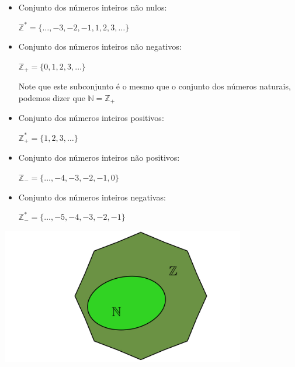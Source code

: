 \documentclass[10pt]{article}
\begin{document}
\begin{multicols}{2}
    \begin{itemize}
        \item Conjunto dos números inteiros não nulos:

            \( \mathbb{Z}^* = \{\ldots, -3, -2, -1, 1, 2, 3, \ldots \} \)
        \item Conjunto dos números inteiros não negativos:
            
            \( \mathbb{Z}_+ = \{0, 1, 2, 3, \ldots \} \)
            
            \begin{obs}
            Note que este subconjunto é o mesmo que o conjunto dos números naturais, podemos dizer que \( \mathbb{N} = \mathbb{Z}_+\)
            \end{obs}
        \item Conjunto dos números inteiros positivos:
        
            \( \mathbb{Z}^*_+ = \{1, 2, 3, \ldots \} \)
        \item Conjunto dos números inteiros não positivos:
        
            \( \mathbb{Z}_- = \{\ldots, -4, -3, -2, -1, 0 \} \)
        \item Conjunto dos números inteiros negativas:
        
            \( \mathbb{Z}^*_- = \{\ldots, -5, -4, -3, -2, -1\} \)
        
    \end{itemize}
\columnbreak
\bigskip
\noindent
    \begin{minipage}{\linewidth}
        \centering 
        \includegraphics[width=0.8\textwidth]{imgs/conjuntosNumerico/conjuntosInteiros.pdf}
        \label{fig:conjuntosInteiros} 
    \end{minipage}%
\end{multicols} 
\end{document}
